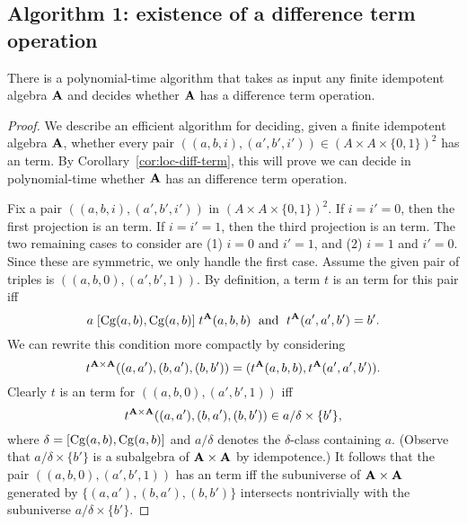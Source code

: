 \subsection{Algorithm 1: existence of a difference term operation}
\label{sec:algor-1}
\begin{corollary}
  \label{cor:algor-1}
  There is a polynomial-time algorithm that takes as input
  any finite idempotent algebra $\mathbf{A}$ and decides whether
  $\mathbf{A}$ has a difference term operation.
\end{corollary}
\begin{proof}
  We describe an efficient algorithm for deciding,
  given a finite idempotent algebra $\mathbf{A}$,
  whether every pair $((a,b,i), (a',b',i')) \in (A\times A \times \{0,1\})^2$ 
  has an \ld term.  By Corollary~\ref{cor:loc-diff-term}, this will prove we
  can decide in polynomial-time whether $\mathbf{A}$ has an difference term operation.

  Fix a pair
  $((a,b,i), (a',b',i'))$ in $(A\times A \times \{0,1\})^2$. If $i = i' = 0$,
  then the first projection is an \ld term. If $i = i' = 1$,
    then the third projection is an \ld term. The two remaining cases to
    consider are (1) $i = 0$ and $i'=1$, and (2)
    $i = 1$ and $i'=0$. Since these are symmetric, we only handle the
    first case. Assume  the given pair of triples is
    $((a,b,0), (a',b',1))$.  By definition, a term $t$ is 
    an \ld term for this pair iff
    \[
    a\mathrel{[\operatorname{Cg}(a,b), \operatorname{Cg}(a,b)]} t^{\mathbf{A}}(a,b,b) \; \text{ and } \;
    t^{\mathbf{A}}(a',a',b') = b'.
    \]
    We can rewrite this condition more compactly by
    considering
    \[t^{\mathbf{A}\times \mathbf{A}}((a,a'), (b,a'), (b,b')) =
    (t^{\mathbf{A}}(a,b,b),t^{\mathbf{A}}(a',a',b')).\]
    Clearly $t$ is an \ld term for
    $((a,b,0), (a',b',1))$ iff
    \[
    t^{\mathbf{A}\times \mathbf{A}}((a,a'), (b,a'), (b,b'))\in a/\delta \times \{b'\},
    \]
    where $\delta = [\operatorname{Cg}(a,b), \operatorname{Cg}(a,b)]$ and $a/\delta$ denotes the
    $\delta$-class containing $a$.
    (Observe that $a/\delta \times \{b'\}$ is a subalgebra of $\mathbf{A} \times \mathbf{A}$
    by idempotence.)
    It follows that the pair
    $((a,b,0), (a',b',1))$ has an \ld term iff
    the subuniverse of $\mathbf{A}\times \mathbf{A}$ generated by
    $\{(a,a'), (b,a'), (b,b')\}$ intersects nontrivially with the subuniverse
    $a/\delta \times \{b'\}$.


\end{proof}

